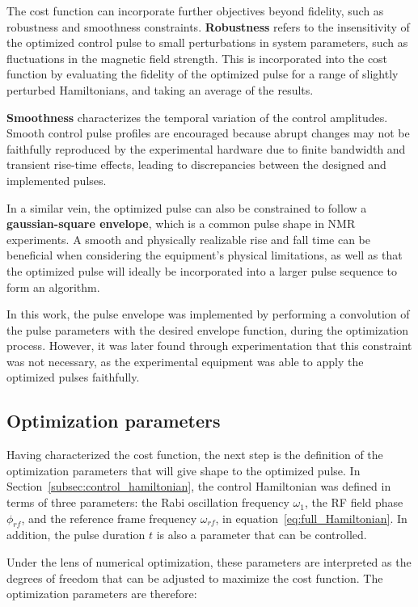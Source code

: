 The cost function can incorporate further objectives beyond fidelity, such as robustness and smoothness constraints. \textbf{Robustness} refers to the insensitivity of the optimized control pulse to small perturbations in system parameters, such as fluctuations in the magnetic field strength. This is incorporated into the cost function by evaluating the fidelity of the optimized pulse for a range of slightly perturbed Hamiltonians, and taking an average of the results.

\textbf{Smoothness} characterizes the temporal variation of the control amplitudes. Smooth control pulse profiles are encouraged because abrupt changes may not be faithfully reproduced by the experimental hardware due to finite bandwidth and transient rise-time effects, leading to discrepancies between the designed and implemented pulses.

In a similar vein, the optimized pulse can also be constrained to follow a \textbf{gaussian-square envelope}, which is a common pulse shape in NMR experiments. A smooth and physically realizable rise and fall time can be beneficial when considering the equipment's physical limitations, as well as that the optimized pulse will ideally be incorporated into a larger pulse sequence to form an algorithm.

In this work, the pulse envelope was implemented by performing a convolution of the pulse parameters with the desired envelope function, during the optimization process. However, it was later found through experimentation that this constraint was not necessary, as the experimental equipment was able to apply the optimized pulses faithfully.

\subsection{Optimization parameters}
\label{subsec:optimization_parameters}

Having characterized the cost function, the next step is the definition of the optimization parameters that will give shape to the optimized pulse. In Section~\ref{subsec:control_hamiltonian}, the control Hamiltonian was defined in terms of three parameters: the Rabi oscillation frequency \(\omega_1\), the RF field phase \(\phi_{rf}\), and the reference frame frequency \(\omega_{rf}\), in equation~\ref{eq:full_Hamiltonian}. In addition, the pulse duration \(t\) is also a parameter that can be controlled.

Under the lens of numerical optimization, these parameters are interpreted as the degrees of freedom that can be adjusted to maximize the cost function. The optimization parameters are therefore:

